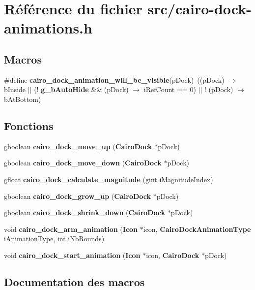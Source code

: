\section{Référence du fichier src/cairo-dock-animations.h}
\label{cairo-dock-animations_8h}
\subsection*{Macros}
\begin{CompactItemize}
\item 
\#define {\bf cairo\_\-dock\_\-animation\_\-will\_\-be\_\-visible}(pDock)~((pDock) $\rightarrow$ bInside $|$$|$ (! {\bf g\_\-bAutoHide} \&\& (pDock) $\rightarrow$ iRefCount == 0) $|$$|$ ! (pDock) $\rightarrow$ bAtBottom)
\end{CompactItemize}
\subsection*{Fonctions}
\begin{CompactItemize}
\item 
gboolean {\bf cairo\_\-dock\_\-move\_\-up} ({\bf CairoDock} $\ast$pDock)
\item 
gboolean {\bf cairo\_\-dock\_\-move\_\-down} ({\bf CairoDock} $\ast$pDock)
\item 
gfloat {\bf cairo\_\-dock\_\-calculate\_\-magnitude} (gint iMagnitudeIndex)
\item 
gboolean {\bf cairo\_\-dock\_\-grow\_\-up} ({\bf CairoDock} $\ast$pDock)
\item 
gboolean {\bf cairo\_\-dock\_\-shrink\_\-down} ({\bf CairoDock} $\ast$pDock)
\item 
void {\bf cairo\_\-dock\_\-arm\_\-animation} ({\bf Icon} $\ast$icon, {\bf CairoDockAnimationType} iAnimationType, int iNbRounds)
\item 
void {\bf cairo\_\-dock\_\-start\_\-animation} ({\bf Icon} $\ast$icon, {\bf CairoDock} $\ast$pDock)
\end{CompactItemize}


\subsection{Documentation des macros}
